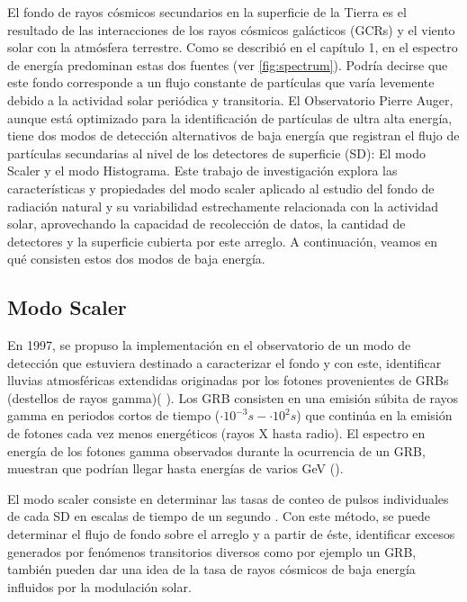 El fondo de rayos cósmicos secundarios en la superficie de la Tierra es el resultado de las interacciones de los rayos cósmicos galácticos (GCRs) y el viento solar con la atmósfera terrestre. Como se describió en el capítulo 1, en el espectro de energía predominan estas dos fuentes (ver \ref{fig:spectrum}). Podría decirse que este fondo corresponde a un flujo constante de partículas que varía levemente debido a la actividad solar periódica y transitoria. El Observatorio Pierre Auger, aunque está optimizado para la identificación de partículas de ultra alta energía, tiene dos modos de detección alternativos de baja energía que registran el flujo de partículas secundarias al nivel de los detectores de superficie (SD): El modo Scaler y el modo Histograma. Este trabajo de investigación explora las características y propiedades del modo scaler aplicado al estudio del fondo de radiación natural y su variabilidad estrechamente relacionada con la actividad solar, aprovechando la capacidad de recolección de datos, la cantidad de detectores y la superficie cubierta por este arreglo. A continuación, veamos en qué consisten estos dos modos de baja energía.

\subsection{Modo Scaler}

En 1997, se propuso la implementación en el observatorio de un modo de detección que estuviera destinado a caracterizar el fondo y  con este, identificar lluvias atmosféricas extendidas originadas por los fotones provenientes de GRBs (destellos de rayos gamma)(\cite{asorey} \cite{bertou_2011}). Los GRB consisten en una emisión súbita de rayos gamma en periodos cortos de tiempo ($\cdot 10^{-3}s - \cdot 10^{2}s$) que continúa en la emisión de fotones cada vez menos energéticos (rayos X hasta radio). El espectro en energía de los fotones gamma observados durante la ocurrencia de un GRB, muestran que podrían llegar hasta energías de varios GeV (\cite{Bernlöhr_1996}).


El modo scaler consiste en determinar las tasas de conteo de pulsos individuales de cada SD en escalas de tiempo de un segundo \cite{asorey}. Con este método, se puede determinar el flujo de fondo sobre el arreglo y a partir de éste, identificar excesos generados por fenómenos transitorios diversos como por ejemplo un GRB, también pueden dar una idea de la tasa de rayos cósmicos de baja energía influidos por la modulación solar.

